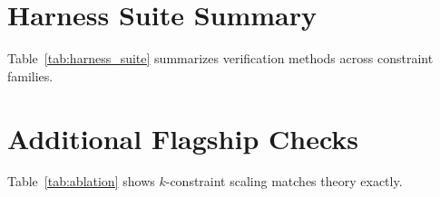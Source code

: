\documentclass{article}
\theoremstyle{plain}
\theoremstyle{definition}
\theoremstyle{remark}
\begin{document}
\renewcommand{\thetable}{A\arabic{table}}
\setcounter{table}{0}
\renewcommand{\thefigure}{A\arabic{figure}}
\setcounter{figure}{0}
\renewcommand{\theequation}{A\arabic{equation}}
\setcounter{equation}{0}
\makeatletter
\renewcommand{\theHtable}{appendix.\thesection.\arabic{table}}
\renewcommand{\theHfigure}{appendix.\thesection.\arabic{figure}}
\renewcommand{\theHequation}{appendix.\thesection.\arabic{equation}}
\makeatother

\section{Harness Suite Summary}\label{app:harness_suite}
Table~\ref{tab:harness_suite} summarizes verification methods across constraint families.

\begin{table}[ht]
\centering
\small
\caption{Harness suite across representation families. Core results use deterministic verification (parsers, solvers, FFT). Interactive prompts are supplemental demonstrations with human judgment, not part of judge-free claims.}
\label{tab:harness_suite}
\end{table}

\section{Additional Flagship Checks}\label{app:k_scaling}
Table~\ref{tab:ablation} shows $k$-constraint scaling matches theory exactly.
\end{document}
